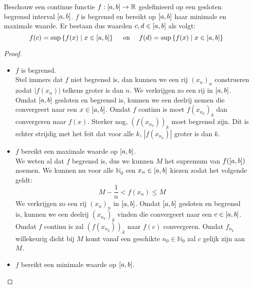 \documentclass[main.tex]{subfiles}
\begin{document}
\begin{st}
  Beschouw een continue functie $f: \interval{a}{b} \rightarrow \mathbb{R}$ gedefinieerd op een gesloten begrensd interval $\interval{a}{b}$.
  $f$ is begrensd en bereikt op $\interval{a}{b}$ haar minimale en maximale waarde.
  Er bestaan dus waarden $c,d \in \interval{a}{b}$ als volgt:
  \[ f(c) = \sup\left\{ f(x) \mid x \in \interval{a}{b} \right\} \quad\text{ en }\quad f(d) = \sup\left\{ f(x) \mid x \in \interval{a}{b} \right\} \]

  \begin{proof}
    \begin{itemize}
    \item $f$ is begrensd.\\
      Stel immers dat $f$ niet begrensd is, dan kunnen we een rij $(x_{n})_{n}$ construeren zodat $|f(x_{n})|$ telkens groter is dan $n$.
      We verkrijgen zo een rij in $\interval{a}{b}$.
      Omdat $\interval{a}{b}$ gesloten en begrensd is, kunnen we een deelrij nemen die convergeert naar een $x\in\interval{a}{b}$.
      Omdat $f$ continu is moet $f(x_{n_{k}})_{k}$ dan convergeren naar $f(x)$.
      Sterker nog, $(f(x_{n_{k}}))_{k}$ moet begrensd zijn.
      Dit is echter strijdig met het feit dat voor alle $k$, $|f(x_{n_{k}})|$ groter is dan $k$.
    \item $f$ bereikt een maximale waarde op $\interval{a}{b}$.\\
      We weten al dat $f$ begrensd is, dus we kunnen $M$ het supremum van $f(\interval{a}{b})$ noemen.
      We kunnen nu voor alle $\mathbb{N}_{0}$ een $x_{n} \in \interval{a}{b}$ kiezen zodat het volgende geldt:\waarom
      \[ M- \frac{1}{n} < f(x_{n}) \le M \]
      We verkrijgen zo een rij $(x_{n})_{n}$ in $\interval{a}{b}$.
      Omdat $\interval{a}{b}$ gesloten en begrensd is, kunnen we een deelrij $(x_{n_{k}})_{k}$ vinden die convergeert naar een $c\in \interval{a}{b}$.
      Omdat $f$ continu is zal $(f(x_{n_{k}}))_{k}$ naar $f(c)$ convergeren.
      Omdat $f_{n_{k}}$ willekeurig dicht bij $M$ komt vanaf een geschikte $n_{0}\in\mathbb{N}_{0}$ zal $c$ gelijk zijn aan $M$.
    \item $f$ bereikt een minimale waarde op $\interval{a}{b}$.\\
    \end{itemize}
  \end{proof}
\end{st}
\end{document}
